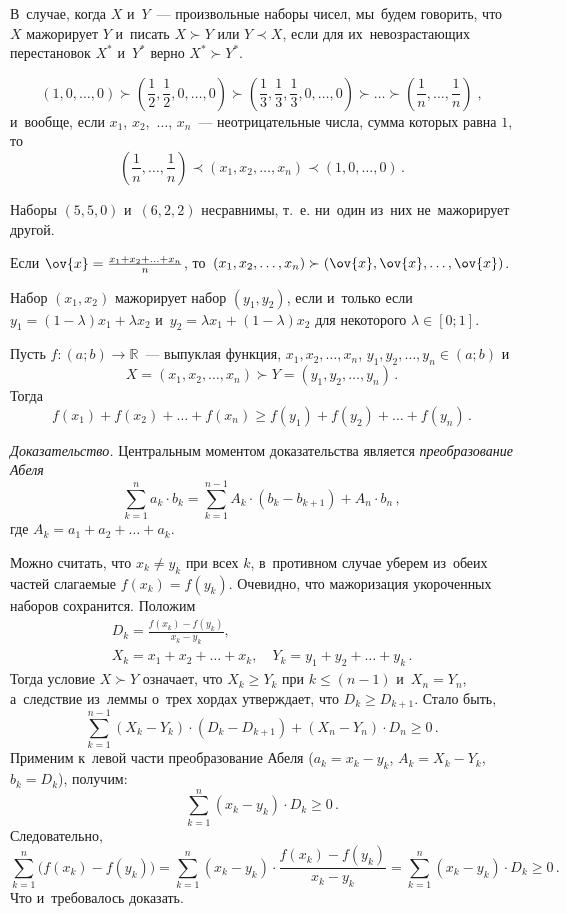 В~случае, когда $X$ и~$Y$~--- произвольные наборы чисел,  мы~будем говорить,
что $X$ мажорирует $Y$ и~писать $X\succ Y$ или $Y\prec X$, если для
их~невозрастающих перестановок $X^*$ и~$Y^*$ верно $X^*\succ Y^*$.

\[
    \left( 1, 0, \ldots, 0 \right)
\succ
    \left( \frac{1}{2}, \frac{1}{2}, 0, \ldots,0 \right)
\succ
    \left( \frac{1}{3}, \frac{1}{3}, \frac{1}{3}, 0, \ldots, 0 \right)
\succ\ldots\succ
    \left( \frac{1}{n}, \ldots, \frac{1}{n} \right)
\;,\]
и~вообще, если $x_1$, $x_2$,~$\dots$, $x_n$~--- неотрицательные числа, сумма
которых равна $1$, то%
\[
    \left( \frac{1}{n}, \ldots, \frac{1}{n} \right)
\prec
    \left( x_1, x_2, \ldots, x_n \right)
\prec
    \left( 1, 0, \ldots, 0 \right)
\,.\]

Наборы $(5, 5, 0)$ и~$(6, 2, 2)$ несравнимы, т.~е. ни~один из~них
не~мажорирует другой.

Если $\ov{x} = \frac{x_1 + x_2 + \ldots + x_n}{n}$,
то~$(x_1, x_2, \ldots, x_n) \succ (\ov{x}, \ov{x}, \ldots, \ov{x})$.

Набор $(x_1, x_2)$ мажорирует набор $(y_1, y_2)$, если и~только если
$y_1 = (1 - \lambda) x_1 + \lambda x_2$
и~$y_2 = \lambda x_1 + (1 - \lambda) x_2$
для некоторого $\lambda \in [0; 1]$.

\hrulefill

Пусть $f \colon (a; b) \to \mathbb{R}$~--- выпуклая функция,
$x_1, x_2, \ldots, x_n$, $y_1, y_2, \ldots, y_n \in (a; b)$ и%
\[
    X = (x_1, x_2, \ldots, x_n) \succ Y = (y_1, y_2, \ldots, y_n)
\,.\]
Тогда
\[
    f(x_1) + f(x_2) + \ldots + f(x_n)
\geq
    f(y_1) + f(y_2) + \ldots + f(y_n)
\,.\]

\textit{Доказательство.}
Центральным моментом доказательства является \emph{преобразование Абеля}
\[
    \sum\limits_{k=1}^n
        a_k \cdot b_k
=
    \sum\limits_{k=1}^{n-1}
        A_k \cdot (b_k - b_{k+1}) + A_n \cdot b_n
\,,\]
где $A_k = a_1 + a_2 + \ldots + a_k$.

Можно считать, что $x_k \neq y_k$ при всех $k$, в~противном случае уберем
из~обеих частей слагаемые $f(x_k) = f(y_k)$.
Очевидно, что мажоризация укороченных наборов сохранится.
Положим
\begin{gather*}
    D_k = \frac{f(x_k) - f(y_k)}{x_k - y_k}
,\\
    X_k = x_1 + x_2 + \ldots + x_k
,\quad
    Y_k = y_1 + y_2 + \ldots + y_k
\,.\end{gather*}
Тогда условие $X \succ Y$ означает, что $X_k \geq Y_k$ при $k \leq (n - 1)$
и~$X_n = Y_n$, а~следствие из~леммы о~трех хордах утверждает, что
$D_k \geq D_{k+1}$.
Стало быть,
\[
    \sum\limits_{k=1}^{n-1}
        (X_k - Y_k) \cdot (D_k - D_{k+1})
    +
    (X_n - Y_n) \cdot D_n
\geq
    0
\,.\]
Применим к~левой части преобразование Абеля
($a_k = x_k - y_k$, $A_k = X_k - Y_k$, $b_k = D_k$), получим:
\[
    \sum\limits_{k=1}^n
        (x_k - y_k) \cdot D_k
\geq
    0
\,.\]
Следовательно,
\[
    \sum\limits_{k=1}^n
        \bigl( f(x_k) - f(y_k) \bigr)
=
    \sum\limits_{k=1}^n
        (x_k - y_k) \cdot \frac{f(x_k) - f(y_k)}{x_k - y_k}
=
    \sum\limits_{k=1}^n
        (x_k - y_k) \cdot D_k
\geq
    0
\,.\]
Что и~требовалось доказать.


